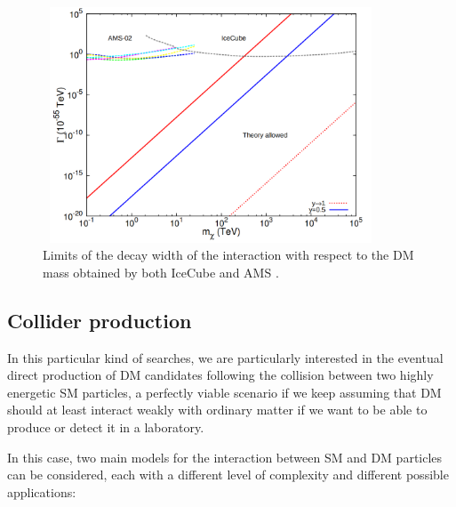 \documentclass[a4paper, 10pt, openright]{report}
\begin{document}
\begin{figure}[htbp]
\begin{center}
\includegraphics[width=10cm, height=7cm]{figs/AMSData.png}
\caption{Limits of the decay width of the interaction with respect to the \ac{DM} mass obtained by both IceCube and \ac{AMS} \cite{AMSData}.}
\label{fig:AMSData}
\end{center}
\end{figure}


\subsection{Collider production} \label{subsection:ColliderProduction}

In this particular kind of searches, we are particularly interested in the eventual direct production of \ac{DM} candidates following the collision between two highly energetic \ac{SM} particles, a perfectly viable scenario if we keep assuming that \ac{DM} should at least interact weakly with ordinary matter if we want to be able to produce or detect it in a laboratory.

In this case, two main models for the interaction between \ac{SM} and \ac{DM} particles can be considered, each with a different level of complexity and different possible applications:
\end{document}
